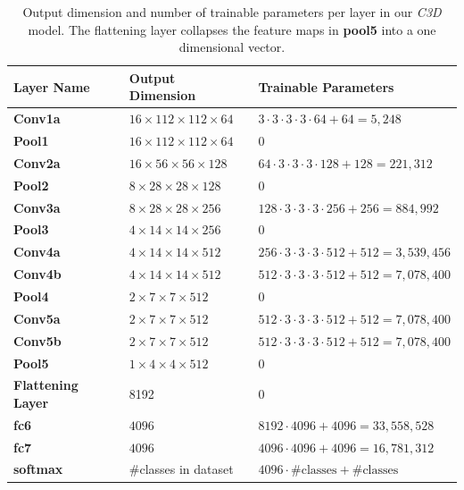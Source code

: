 \begin{table}[H]
    \renewcommand{\arraystretch}{1.3}
    \begin{tabularx}{\textwidth}{l X l}
    Layer Name & Output Dimension & Trainable Parameters \\
    \hline
    \textbf{Conv1a} & $16 \times 112 \times 112 \times 64$ & $3 \cdot 3 \cdot 3 \cdot 3 \cdot 64 + 64 = 5,248$\\
    \textbf{Pool1} & $16 \times 112 \times 112 \times 64$ & 0 \\
    \textbf{Conv2a} & $16 \times 56 \times 56 \times 128$ & $64 \cdot 3 \cdot 3 \cdot 3 \cdot 128 + 128 = 221,312$\\
    \textbf{Pool2}& $8 \times 28 \times 28 \times 128$ & 0 \\
    \textbf{Conv3a} & $8 \times 28 \times 28 \times 256$ & $128 \cdot 3 \cdot 3 \cdot 3 \cdot 256 + 256 = 884,992$ \\
    \textbf{Pool3} & $4 \times 14 \times 14 \times 256$ & 0 \\
    \textbf{Conv4a} & $4 \times 14 \times 14 \times 512$ & $256 \cdot 3 \cdot 3 \cdot 3 \cdot 512 + 512 = 3,539,456$ \\
    \textbf{Conv4b} & $4 \times 14 \times 14 \times 512$ & $512 \cdot 3 \cdot 3 \cdot 3 \cdot 512 + 512 = 7,078,400$ \\
    \textbf{Pool4} & $2 \times 7 \times 7 \times 512$ & 0 \\
    \textbf{Conv5a} & $2 \times 7 \times 7 \times 512$ & $512 \cdot 3 \cdot 3 \cdot 3 \cdot 512 + 512 = 7,078,400$ \\
    \textbf{Conv5b} & $2 \times 7 \times 7 \times 512$ & $512 \cdot 3 \cdot 3 \cdot 3 \cdot 512 + 512 = 7,078,400$ \\
    \textbf{Pool5} & $1 \times 4 \times 4 \times 512$ & 0 \\
    \textbf{Flattening Layer} & 8192 & 0 \\
    \textbf{fc6}& $4096$ & $8192 \cdot 4096 + 4096 = 33,558,528$ \\
    \textbf{fc7} & $4096$ & $4096 \cdot 4096 + 4096 = 16,781,312$ \\
    \textbf{softmax} & \#classes in dataset & $4096 \cdot \text{\#classes} + \text{\#classes}$ \\
    \end{tabularx}
    \caption{Output dimension and number of trainable parameters per layer in our \textit{C3D} model. The flattening layer collapses the feature maps in \textbf{pool5} into a one dimensional vector.}
    \label{tab:num_params}
\end{table}

